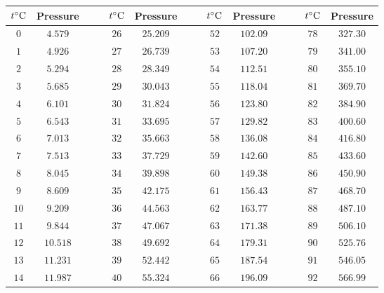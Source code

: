 \begin{tabular}{cccccccccccccc}                                                                        \toprule
${t}^{\circ}\textrm{C}$ & Pressure &&& ${t}^{\circ}\textrm{C}$ & Pressure &&& ${t}^{\circ}\textrm{C}$ & Pressure &&& ${t}^{\circ}\textrm{C}$ & Pressure \\\midrule
$0$           & $4.579$  &&& $26$          & $25.209$ &&& $52$          & $102.09$ &&& $78$          & $327.30$ \\
$1$           & $4.926$  &&& $27$          & $26.739$ &&& $53$          & $107.20$ &&& $79$          & $341.00$ \\
$2$           & $5.294$  &&& $28$          & $28.349$ &&& $54$          & $112.51$ &&& $80$          & $355.10$ \\
$3$           & $5.685$  &&& $29$          & $30.043$ &&& $55$          & $118.04$ &&& $81$          & $369.70$ \\
$4$           & $6.101$  &&& $30$          & $31.824$ &&& $56$          & $123.80$ &&& $82$          & $384.90$ \\
$5$           & $6.543$  &&& $31$          & $33.695$ &&& $57$          & $129.82$ &&& $83$          & $400.60$ \\
$6$           & $7.013$  &&& $32$          & $35.663$ &&& $58$          & $136.08$ &&& $84$          & $416.80$ \\
$7$           & $7.513$  &&& $33$          & $37.729$ &&& $59$          & $142.60$ &&& $85$          & $433.60$ \\
$8$           & $8.045$  &&& $34$          & $39.898$ &&& $60$          & $149.38$ &&& $86$          & $450.90$ \\
$9$           & $8.609$  &&& $35$          & $42.175$ &&& $61$          & $156.43$ &&& $87$          & $468.70$ \\
$10$          & $9.209$  &&& $36$          & $44.563$ &&& $62$          & $163.77$ &&& $88$          & $487.10$ \\
$11$          & $9.844$  &&& $37$          & $47.067$ &&& $63$          & $171.38$ &&& $89$          & $506.10$ \\
$12$          & $10.518$ &&& $38$          & $49.692$ &&& $64$          & $179.31$ &&& $90$          & $525.76$ \\
$13$          & $11.231$ &&& $39$          & $52.442$ &&& $65$          & $187.54$ &&& $91$          & $546.05$ \\
$14$          & $11.987$ &&& $40$          & $55.324$ &&& $66$          & $196.09$ &&& $92$          & $566.99$ \\

\end{tabular}
